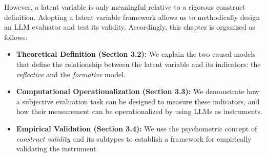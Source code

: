 However, a latent variable is only meaningful relative to a rigorous construct definition. Adopting a latent variable framework allows us to methodically design an LLM evaluator and test its validity. Accordingly, this chapter is organized as follows: 

\begin{itemize}
    \item \textbf{Theoretical Definition (Section 3.2):} We explain the two causal models that define the relationship between the latent variable and its indicators: the \emph{reflective} and the \emph{formative} model. 
    \item \textbf{Computational Operationalization (Section 3.3):} We demonstrate how a subjective evaluation task can be designed to measure these indicators, and how their measurement can be operationalized by using LLMs as instruments.
    \item \textbf{Empirical Validation (Section 3.4):} We use the psychometric concept of \textit{construct validity} and its subtypes to establish a framework for empirically validating the instrument.
\end{itemize}








